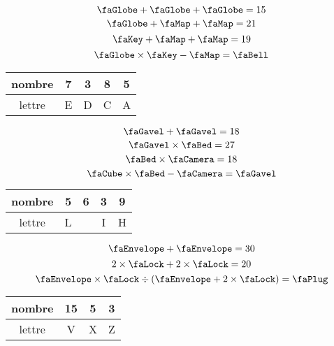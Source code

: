 \documentclass[12pt,a4paper,french,fleqn]{/home/nyaucki/Documents/Prof/CoursMaths/mycls/activite}
\begin{document}
\begin{minipage}{0.3\textwidth}
    $$\remplacea + \remplacea + \remplacea = 15$$
    $$\remplacea + \remplacec + \remplacec = 21$$
    $$\remplaced + \remplacec + \remplacec = 19$$
    $$\remplacea \times \remplaced - \remplacec=\remplacee$$

    \begin{center}
    \begin{tabular}{c*{4}{|c}}
        nombre & 7 & 3 & 8 & 5 \\\hline
        lettre & E & D & C & A    
    \end{tabular}
    \end{center}
\end{minipage}
\hfil
\vrule
\hfil
\begin{minipage}{0.3\textwidth}
    $$\remplaceh + \remplaceh = 18$$
    $$\remplaceh \times \remplacei = 27$$
    $$\remplacei \times \remplace = 18 $$
    $$\remplacel \times\remplacei - \remplace=\remplaceh$$

    \begin{center}
    \begin{tabular}{c*{4}{|c}}
        nombre & 5 & 6 & 3 & 9 \\\hline
        lettre & L &   & I & H     
    \end{tabular}
    \end{center}
\end{minipage}
\hfil
\vrule
\hfil
\begin{minipage}{0.3\textwidth}
$$\remplacev + \remplacev = 30$$
$$2\times\remplacex + 2\times\remplacex = 20$$
$$\remplacev \times \remplacex \div(\remplacev +2\times \remplacex)  =\remplacez$$

\begin{center}
\begin{tabular}{c*{3}{|c}}
    nombre & 15 & 5 & 3 \\\hline
    lettre & V & X & Z      
\end{tabular}
\end{center}
\end{minipage}
\end{document}
